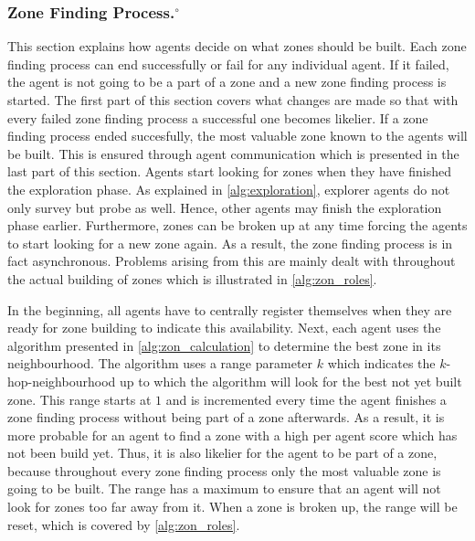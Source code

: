 \subsubsection[Zone Finding Process.]{Zone Finding Process.$^\circ$}\label{alg:zon_finding}
This section explains how agents decide on what zones should be built.
Each zone finding process can end successfully or fail for any individual agent.
If it failed, the agent is not going to be a part of a zone and a new zone finding process is started.
The first part of this section covers what changes are made so that with every failed zone finding process a successful one becomes likelier.
If a zone finding process ended succesfully, the most valuable zone known to the agents will be built.
This is ensured through agent communication which is presented in the last part of this section.
Agents start looking for zones when they have finished the exploration phase.
As explained in \autoref{alg:exploration}, explorer agents do not only survey but probe as well.
Hence, other agents may finish the exploration phase earlier.
Furthermore, zones can be broken up at any time forcing the agents to start looking for a new zone again.
As a result, the zone finding process is in fact asynchronous.
Problems arising from this are mainly dealt with throughout the actual building of zones which is illustrated in \autoref{alg:zon_roles}.

In the beginning, all agents have to centrally register themselves when they are ready for zone building to indicate this availability.
Next, each agent uses the algorithm presented in \autoref{alg:zon_calculation} to determine the best zone in its neighbourhood.
The algorithm uses a range parameter $k$ which indicates the $k$-hop-neighbourhood up to which the algorithm will look for the best not yet built zone.
This range starts at $1$ and is incremented every time the agent finishes a zone finding process without being part of a zone afterwards.
As a result, it is more probable for an agent to find a zone with a high per agent score which has not been build yet.
Thus, it is also likelier for the agent to be part of a zone, because throughout every zone finding process only the most valuable zone is going to be built.
The range has a maximum to ensure that an agent will not look for zones too far away from it.
When a zone is broken up, the range will be reset, which is covered by \autoref{alg:zon_roles}.

